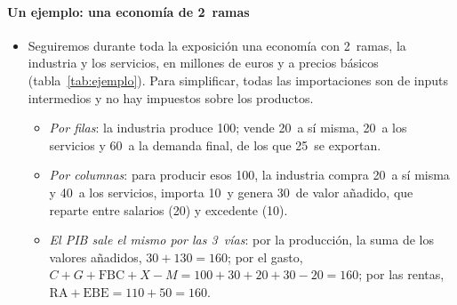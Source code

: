 \documentclass[11pt]{article}
\begin{document}
\paragraph{Un ejemplo: una economía de 2~ramas}

\begin{itemize}
\item Seguiremos durante toda la exposición una economía con 2~ramas, la industria y los servicios, en millones de euros y a precios básicos (tabla~\ref{tab:ejemplo}). Para simplificar, todas las importaciones son de inputs intermedios y no hay impuestos sobre los productos.
  \begin{itemize}
  \item \emph{Por filas}: la industria produce 100; vende 20~a sí misma, 20~a los servicios y 60~a la demanda final, de los que 25~se exportan.
  \item \emph{Por columnas}: para producir esos 100, la industria compra 20~a sí misma y 40~a los servicios, importa 10~y genera 30~de valor añadido, que reparte entre salarios (20) y excedente (10).
  \item \emph{El PIB sale el mismo por las 3~vías}: por la producción, la suma de los valores añadidos, $30+130=160$; por el gasto, $C+G+\mathrm{FBC}+X-M=100+30+20+30-20=160$; por las rentas, $\mathrm{RA}+\mathrm{EBE}=110+50=160$.
  \end{itemize}
\end{itemize}
\end{document}

